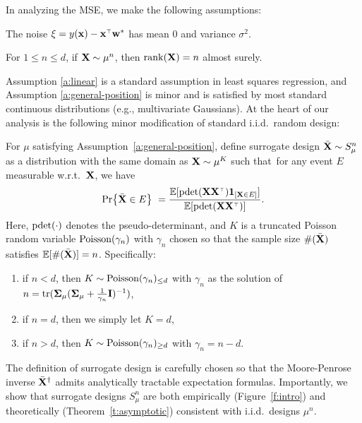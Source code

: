 \documentclass[11pt]{article}
\begin{document}
In analyzing the MSE, we make the following assumptions:
\begin{assumption}\label{a:linear}
  The noise $\xi =y(\x)- \x^\top\w^*$ has mean $0$ and variance $\sigma^2$.
\end{assumption}
\begin{assumption}\label{a:general-position}
  For $1\leq n \leq d$, if $\mathbf X\sim\mu^n$, then $\mathrm{rank}(\mathbf X)=n$ almost surely.
\end{assumption}
\noindent
Assumption \ref{a:linear} is a standard assumption in least squares regression,
and Assumption \ref{a:general-position} is minor and is satisfied by
most standard continuous distributions (e.g., multivariate Gaussians).
At the heart of our analysis is the following minor modification of standard
i.i.d.~random design:

\begin{definition} \label{d:surrogate}
  For $\mu$ satisfying Assumption~\ref{a:general-position},
  define surrogate design ${\bar{\mathbf X}} \sim S_\mu^n$ as a distribution
  with the same domain as $\mathbf X\sim\mu^K$ such that~for any
  event $E$ measurable w.r.t.~$\mathbf X$, we have\vspace{-2mm}
  \begin{align*}
    \Pr\big\{\Xb\in E\big\}\ = \frac{\E[\pdet(\X\X^\top)\one_{[\X\in E]}]}{\E[\pdet(\X\X^\top)]}.
  \end{align*}
  Here, $\mathrm{pdet}(\cdot)$ denotes the pseudo-determinant, and
  $K$ is a truncated Poisson random variable ${\operatorname{Poisson}}(\gamma_n)$ with
$\gamma_n$ chosen so that the sample size $\#({\bar{\mathbf X}})$ satisfies $\mathbb E[\#({\bar{\mathbf X}})]=n$. Specifically:
  \begin{enumerate}
    \item if $n<d$, then $K\sim {\operatorname{Poisson}}(\gamma_n)_{\leq d}$ with
          $\gamma_n$ as the solution of
          $n=\mathrm{tr}(\mathbf{\Sigma}_\mu(\mathbf{\Sigma}_\mu+\frac1{\gamma_n}\mathbf I)^{-1})$,
          \vspace{-2mm}
    \item if $n=d$, then we simply let $K=d$,
          \vspace{-2mm}
    \item if $n>d$, then $K\sim{\operatorname{Poisson}}(\gamma_n)_{\geq d}$ with $\gamma_n=n-d$.
  \end{enumerate}
\end{definition}
\noindent
The definition of surrogate design is carefully chosen so that the Moore-Penrose
inverse ${\bar{\mathbf X}}^\dagger$ admits analytically tractable expectation
formulas. Importantly, we show that 
surrogate designs $S_\mu^n$ are both empirically (Figure~\ref{f:intro})
and theoretically (Theorem~\ref{t:asymptotic}) consistent with i.i.d.\
designs $\mu^n$.
\end{document}
